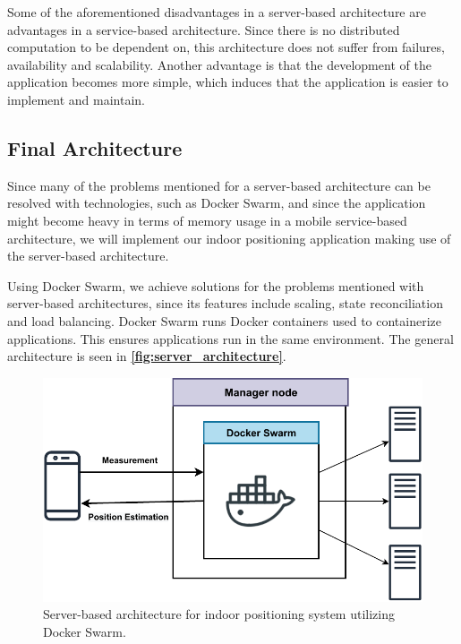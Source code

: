 Some of the aforementioned disadvantages in a server-based architecture are advantages in a service-based architecture. Since there is no distributed computation to be dependent on, this architecture does not suffer from failures, availability and scalability.
Another advantage is that the development of the application becomes more simple, which induces that the application is easier to implement and maintain.

\subsection{Final Architecture} \label{sec:final_architecture}
Since many of the problems mentioned for a server-based architecture can be resolved with technologies, such as Docker Swarm, and since the application might become heavy in terms of memory usage in a mobile service-based architecture, we will implement our indoor positioning application making use of the server-based architecture.

Using Docker Swarm, we achieve solutions for the problems mentioned with server-based architectures, since its features include scaling, state reconciliation and load balancing\cite{dockerswarm}. Docker Swarm runs Docker containers used to containerize applications. This ensures applications run in the same environment.\cite{docker} The general architecture is seen in \textbf{\autoref{fig:server_architecture}}.

\begin{figure}[H]
    \centering
    \includegraphics[scale=0.8]{Images/Technology/serverachitectur.pdf}
    \caption{Server-based architecture for indoor positioning system utilizing Docker Swarm.}
    \label{fig:server_architecture}
\end{figure}

